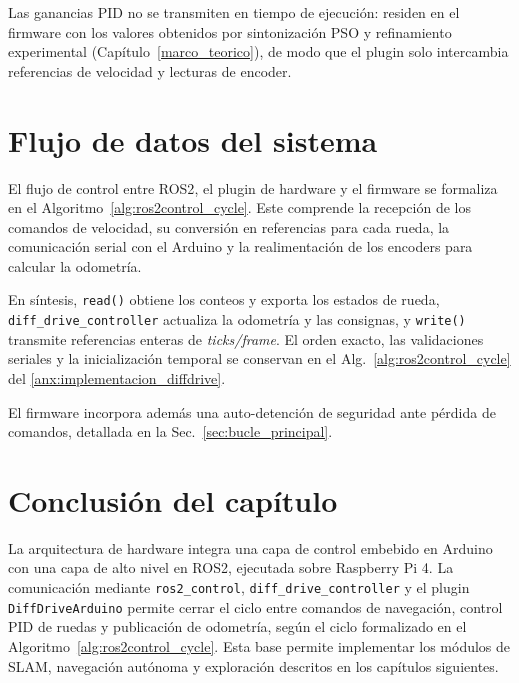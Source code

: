 Las ganancias PID no se transmiten en tiempo de ejecución: residen en el firmware con los valores obtenidos por sintonización PSO y refinamiento experimental (Capítulo~\ref{marco_teorico}), de modo que el plugin solo intercambia referencias de velocidad y lecturas de encoder.

\section{Flujo de datos del sistema}
\label{sec:flujo_datos}

El flujo de control entre \gls{ROS2}, el plugin de hardware y el firmware se formaliza en el Algoritmo~\ref{alg:ros2control_cycle}. Este comprende la recepción de los comandos de velocidad, su conversión en referencias para cada rueda, la comunicación serial con el \gls{Arduino} y la realimentación de los encoders para calcular la odometría.

En síntesis, \texttt{read()} obtiene los conteos y exporta los estados de
rueda, \texttt{diff\_drive\_controller} actualiza la odometría y las consignas,
y \texttt{write()} transmite referencias enteras de \textit{ticks/frame}. El
orden exacto, las validaciones seriales y la inicialización temporal se
conservan en el Alg.~\ref{alg:ros2control_cycle} del
\ref{anx:implementacion_diffdrive}.

El firmware incorpora además una auto-detención de seguridad ante pérdida de comandos, detallada en la Sec.~\ref{sec:bucle_principal}.

\section*{Conclusión del capítulo}

La arquitectura de hardware integra una capa de control embebido en \gls{Arduino} con una capa de alto nivel en \gls{ROS2}, ejecutada sobre Raspberry Pi 4. La comunicación mediante \texttt{ros2\_control}, \texttt{diff\_drive\_controller} y el plugin \texttt{DiffDriveArduino} permite cerrar el ciclo entre comandos de navegación, control PID de ruedas y publicación de odometría, según el ciclo formalizado en el Algoritmo~\ref{alg:ros2control_cycle}. Esta base permite implementar los módulos de SLAM, navegación autónoma y exploración descritos en los capítulos siguientes.